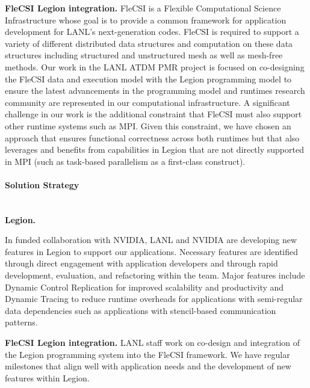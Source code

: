 \textbf{FleCSI Legion integration.}
FleCSI is a Flexible Computational Science Infrastructure whose goal is to provide a common framework for application development for LANL's next-generation codes. FleCSI is required to support a variety of different distributed data structures and computation on these data structures including structured and unstructured mesh as well as mesh-free methods. Our work in the LANL ATDM PMR project is focused on co-designing the FleCSI data and execution model with the Legion programming model to ensure the latest advancements in the programming model and runtimes research community are represented in our computational infrastructure. A significant challenge in our work is the additional constraint that FleCSI must also support other runtime systems such as MPI. Given this constraint, we have chosen an approach that ensures functional correctness across both runtimes but that also leverages and benefits from capabilities in Legion that are not directly supported in MPI (such as task-based parallelism as a first-class construct). 

\paragraph{Solution Strategy} \leavevmode \\
 

\textbf{Legion.}

In funded collaboration with NVIDIA, LANL and NVIDIA are developing new features in Legion to support our applications. Necessary features are identified through direct engagement with application developers and through rapid development, evaluation, and refactoring within the team. Major features include Dynamic Control Replication for improved scalability and productivity and Dynamic Tracing to reduce runtime overheads for  applications with semi-regular data dependencies such as applications with stencil-based communication patterns. 


\textbf{FleCSI Legion integration.}
LANL staff work on co-design and integration of the Legion programming system into the FleCSI framework. We have regular milestones that align well with application needs and the development of new features within Legion. 


